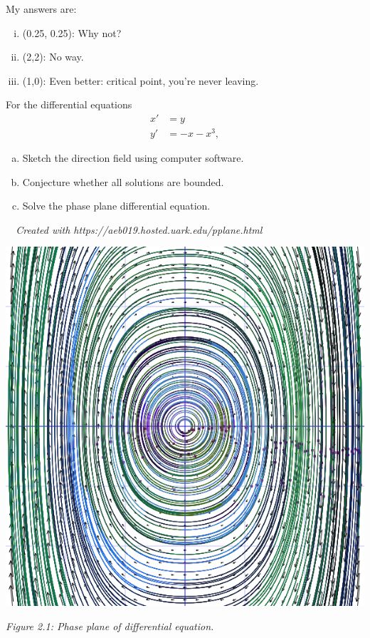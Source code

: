 \documentclass[11pt]{article}
\begin{document}
    \begin{example*}[Answers 1b]My answers are:
        \begin{enumerate}[i.]
            \item (0.25, 0.25): Why not? 
            \item (2,2): No way.
            \item (1,0): Even better: critical point, you're never leaving.
        \end{enumerate}
    \end{example*}
    \begin{problem}
        \setcounter{equation}{-1} \break
        For the differential equations
        \begin{align}
            x' &= y \\
            y' &= -x - x^3,
        \end{align}
        \begin{enumerate}[(a)]
            \item Sketch the direction field using computer software.
            \item Conjecture whether all solutions are bounded.
            \item Solve the phase plane differential equation.
        \end{enumerate}
    \end{problem}
    \begin{solution} 
        \textit{$\text{ }$ \newline Created with https://aeb019.hosted.uark.edu/pplane.html}
        \begin{center}
            \includegraphics[scale=0.3]{2.png}
        \end{center}
        \begin{center}
            \textit{Figure 2.1: Phase plane of differential equation.}
        \end{center}
    \end{solution}
\end{document}
